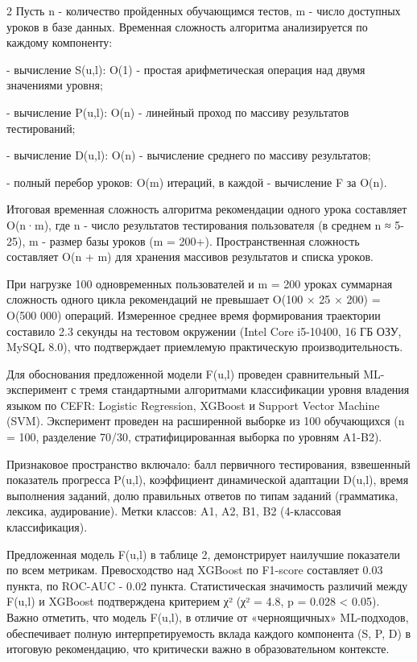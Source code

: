 \begin{multicols}{2}
Пусть n - количество пройденных обучающимся тестов, m - число доступных
уроков в базе данных. Временная сложность алгоритма анализируется по
каждому компоненту:

- вычисление S(u,l): O(1) - простая арифметическая операция над двумя
значениями уровня;

- вычисление P(u,l): O(n) - линейный проход по массиву результатов
тестирований;

- вычисление D(u,l): O(n) - вычисление среднего по массиву результатов;

- полный перебор уроков: O(m) итераций, в каждой - вычисление F за O(n).

Итоговая временная сложность алгоритма рекомендации одного урока
составляет O(n·m), где n - число результатов тестирования пользователя
(в среднем n ≈ 5-25), m - размер базы уроков (m = 200+).
Пространственная сложность составляет O(n + m) для хранения массивов
результатов и списка уроков.

При нагрузке 100 одновременных пользователей и m = 200 уроках суммарная
сложность одного цикла рекомендаций не превышает O(100 × 25 × 200) =
O(500 000) операций. Измеренное среднее время формирования траектории
составило 2.3 секунды на тестовом окружении (Intel Core i5-10400, 16 ГБ
ОЗУ, MySQL 8.0), что подтверждает приемлемую практическую
производительность.

Для обоснования предложенной модели F(u,l) проведен сравнительный
ML-эксперимент с тремя стандартными алгоритмами классификации уровня
владения языком по CEFR: Logistic Regression, XGBoost и Support Vector
Machine (SVM). Эксперимент проведен на расширенной выборке из 100
обучающихся (n = 100, разделение 70/30, стратифицированная выборка по
уровням A1-B2).

Признаковое пространство включало: балл первичного тестирования,
взвешенный показатель прогресса P(u,l), коэффициент динамической
адаптации D(u,l), время выполнения заданий, долю правильных ответов по
типам заданий (грамматика, лексика, аудирование). Метки классов: A1, A2,
B1, B2 (4-классовая классификация).

Предложенная модель F(u,l) в таблице 2, демонстрирует наилучшие
показатели по всем метрикам. Превосходство над XGBoost по F1-score
составляет 0.03 пункта, по ROC-AUC - 0.02 пункта. Статистическая
значимость различий между F(u,l) и XGBoost подтверждена критерием χ² (χ²
= 4.8, p = 0.028 <{} 0.05). Важно отметить, что модель F(u,l), в
отличие от «черноящичных» ML-подходов, обеспечивает полную
интерпретируемость вклада каждого компонента (S, P, D) в итоговую
рекомендацию, что критически важно в образовательном контексте.


\end{multicols}
